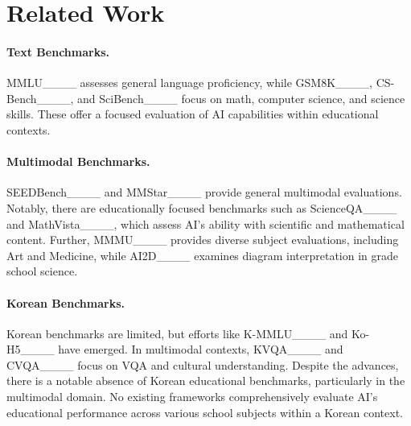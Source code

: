 \section{Related Work}
\label{sec:related_work}

\paragraph{Text Benchmarks.}

MMLU____ assesses general language proficiency, while GSM8K____, CS-Bench____, and SciBench____ focus on math, computer science, and science skills. These offer a focused evaluation of AI capabilities within educational contexts.

\paragraph{Multimodal Benchmarks.}

SEEDBench____ and MMStar____ provide general multimodal evaluations. Notably, there are educationally focused benchmarks such as ScienceQA____ and MathVista____, which assess AI’s ability with scientific and mathematical content. Further, MMMU____ provides diverse subject evaluations, including Art and Medicine, while AI2D____ examines diagram interpretation in grade school science.

\paragraph{Korean Benchmarks.}
Korean benchmarks are limited, but efforts like K-MMLU____ and Ko-H5____ have emerged. In multimodal contexts, KVQA____ and CVQA____ focus on VQA and cultural understanding.
Despite the advances, there is a notable absence of Korean educational benchmarks, particularly in the multimodal domain. No existing frameworks comprehensively evaluate AI's educational performance across various school subjects within a Korean context.